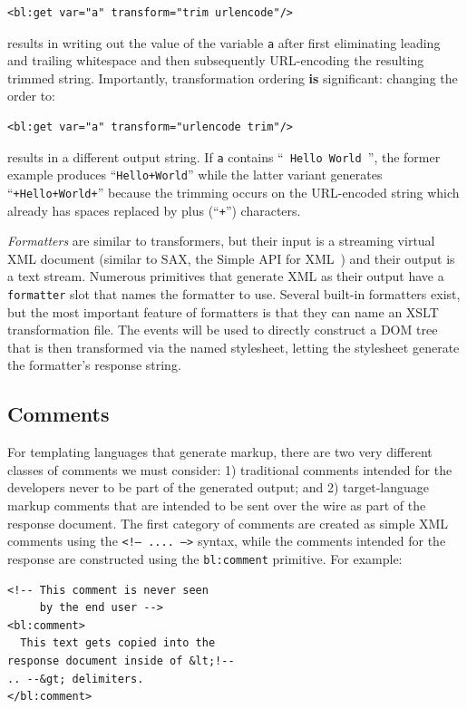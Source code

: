 \documentclass{www2003-submission}
\newcommand{\smtexttt}[1]{{\small\texttt{#1}}}
\begin{document}
\begin{verbatim}
<bl:get var="a" transform="trim urlencode"/>
\end{verbatim}

\noindent results in writing out the value of the variable \smtexttt{a}
after first eliminating leading and trailing whitespace and then
subsequently URL-encoding the resulting trimmed string.  Importantly,
transformation ordering \textbf{is} significant: changing the order to:

\begin{verbatim}
<bl:get var="a" transform="urlencode trim"/>
\end{verbatim}

\noindent results in a different output string.  If \smtexttt{a} contains
``\smtexttt{ Hello World }'', the former example produces ``\smtexttt{Hello+World}'' while
the latter variant generates ``\smtexttt{+Hello+World+}'' because the
trimming occurs on the URL-encoded string which already has spaces
replaced by plus (``\smtexttt{+}'') characters.

\emph{Formatters} are similar to transformers, but their input is a streaming
virtual XML document (similar to SAX, the Simple API for XML~\cite{SAX})
and their output is a text stream.  Numerous primitives that generate
XML as their output have a \smtexttt{formatter} slot that names the
formatter to use. Several built-in formatters exist, but the most
important feature of formatters is that they can name an XSLT
transformation file.   The events will be used to directly construct a
DOM tree that is then transformed via the named stylesheet, letting the
stylesheet generate the formatter's response string.

\subsection{Comments}

For templating languages that generate markup, there are two very
different classes of comments we must consider: 1) traditional
comments intended for the developers never to be part of the generated
output; and 2) target-language markup comments that are intended to be
sent over the wire as part of the response document.  The first
category of comments are created as simple XML comments using the
\smtexttt{<!-- .... -->} syntax, while the comments intended for the
response are constructed using the \smtexttt{bl:comment} primitive.
For example:

\begin{verbatim}
<!-- This comment is never seen
     by the end user -->
<bl:comment>
  This text gets copied into the
response document inside of &lt;!--
.. --&gt; delimiters.
</bl:comment>
\end{verbatim}
\end{document}

